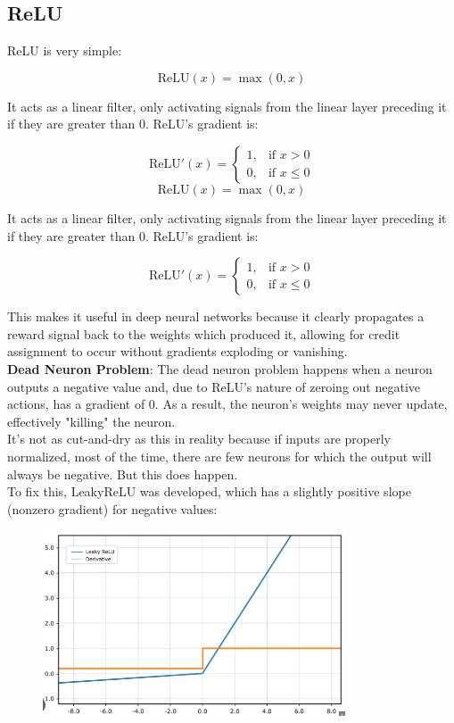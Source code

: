 \documentclass[12pt]{article}
\begin{document}
\subsection{ReLU}

ReLU is very simple: 

\[
\text{ReLU}(x) = \max(0, x)
\]

It acts as a linear filter, only activating signals from the linear layer preceding it if they are greater than 0. ReLU's gradient is:

\[
\text{ReLU}'(x) = 
\begin{cases} 
      1, & \text{if } x > 0 \\
      0, & \text{if } x \leq 0 
   \end{cases}
\]
\[
\text{ReLU}(x) = \max(0, x)
\]

It acts as a linear filter, only activating signals from the linear layer preceding it if they are greater than 0. ReLU's gradient is:

\[
\text{ReLU}'(x) = 
\begin{cases} 
      1, & \text{if } x > 0 \\
      0, & \text{if } x \leq 0 
   \end{cases}
\]

This makes it useful in deep neural networks because it clearly propagates a reward signal back to the weights which produced it, allowing for credit assignment to occur without gradients exploding or vanishing.\\
\textbf{Dead Neuron Problem}: The dead neuron problem happens when a neuron outputs a negative value and, due to ReLU's nature of zeroing out negative actions, has a gradient of 0. As a result, the neuron's weights may never update, effectively "killing" the neuron. \\

It's not as cut-and-dry as this in reality because if inputs are properly normalized, most of the time, there are few neurons for which the output will always be negative. But this does happen. \\ 

To fix this, LeakyReLU was developed, which has a slightly positive slope (nonzero gradient) for negative values: 


\begin{figure}[H]
    \centering
    \includegraphics[width=0.8\textwidth]{LeakyReLU.png} %
\end{figure}
\end{document}
